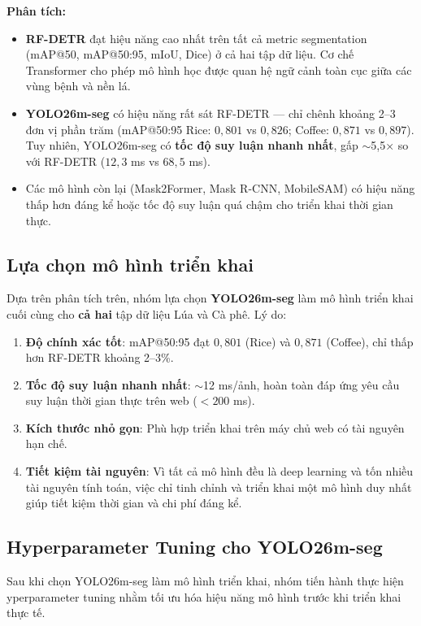 \textbf{Phân tích:}
\begin{itemize}
    \item \textbf{RF-DETR} đạt hiệu năng cao nhất trên tất cả metric segmentation (mAP@50, mAP@50:95, mIoU, Dice) ở cả hai tập dữ liệu. Cơ chế Transformer cho phép mô hình học được quan hệ ngữ cảnh toàn cục giữa các vùng bệnh và nền lá.
    \item \textbf{YOLO26m-seg} có hiệu năng rất sát RF-DETR --- chỉ chênh khoảng 2--3 đơn vị phần trăm (mAP@50:95 Rice: $0,801$ vs $0,826$; Coffee: $0,871$ vs $0,897$). Tuy nhiên, YOLO26m-seg có \textbf{tốc độ suy luận nhanh nhất}, gấp $\sim$5,5× so với RF-DETR ($12,3$ ms vs $68,5$ ms).
    \item Các mô hình còn lại (Mask2Former, Mask R-CNN, MobileSAM) có hiệu năng thấp hơn đáng kể hoặc tốc độ suy luận quá chậm cho triển khai thời gian thực.
\end{itemize}

\subsection{Lựa chọn mô hình triển khai}
\label{subsec:selected_model}

Dựa trên phân tích trên, nhóm lựa chọn \textbf{YOLO26m-seg} làm mô hình triển khai cuối cùng cho \textbf{cả hai} tập dữ liệu Lúa và Cà phê. Lý do:

\begin{enumerate}
    \item \textbf{Độ chính xác tốt}: mAP@50:95 đạt $0,801$ (Rice) và $0,871$ (Coffee), chỉ thấp hơn RF-DETR khoảng 2--3\%.
    \item \textbf{Tốc độ suy luận nhanh nhất}: $\sim$12 ms/ảnh, hoàn toàn đáp ứng yêu cầu suy luận thời gian thực trên web ($< 200$ ms).
    \item \textbf{Kích thước nhỏ gọn}: Phù hợp triển khai trên máy chủ web có tài nguyên hạn chế.
    \item \textbf{Tiết kiệm tài nguyên}: Vì tất cả mô hình đều là deep learning và tốn nhiều tài nguyên tính toán, việc chỉ tinh chỉnh và triển khai một mô hình duy nhất giúp tiết kiệm thời gian và chi phí đáng kể.
\end{enumerate}

\subsection{Hyperparameter Tuning cho YOLO26m-seg}
\label{subsec:hpo}

Sau khi chọn YOLO26m-seg làm mô hình triển khai, nhóm tiến hành thực hiện yperparameter tuning nhằm tối ưu hóa hiệu năng mô hình trước khi triển khai thực tế.

